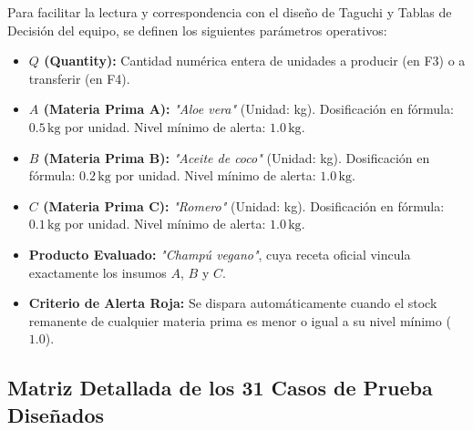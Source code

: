 \documentclass[11pt,a4paper]{article}
\begin{document}
\begin{tcolorbox}[colback=primary!5,colframe=primary,title=\textbf{Nomenclatura y Variables de Prueba Utilizadas en la Matriz}]
Para facilitar la lectura y correspondencia con el diseño de Taguchi y Tablas de Decisión del equipo, se definen los siguientes parámetros operativos:
\begin{itemize}[noitemsep]
    \item \textbf{$Q$ (Quantity):} Cantidad numérica entera de unidades a producir (en F3) o a transferir (en F4).
    \item \textbf{$A$ (Materia Prima A):} \textit{"Aloe vera"} (Unidad: kg). Dosificación en fórmula: $0.5\,\text{kg}$ por unidad. Nivel mínimo de alerta: $1.0\,\text{kg}$.
    \item \textbf{$B$ (Materia Prima B):} \textit{"Aceite de coco"} (Unidad: kg). Dosificación en fórmula: $0.2\,\text{kg}$ por unidad. Nivel mínimo de alerta: $1.0\,\text{kg}$.
    \item \textbf{$C$ (Materia Prima C):} \textit{"Romero"} (Unidad: kg). Dosificación en fórmula: $0.1\,\text{kg}$ por unidad. Nivel mínimo de alerta: $1.0\,\text{kg}$.
    \item \textbf{Producto Evaluado:} \textit{"Champú vegano"}, cuya receta oficial vincula exactamente los insumos $A$, $B$ y $C$.
    \item \textbf{Criterio de Alerta Roja:} Se dispara automáticamente cuando el stock remanente de cualquier materia prima es menor o igual a su nivel mínimo ($1.0$).
\end{itemize}
\end{tcolorbox}

\subsection{Matriz Detallada de los 31 Casos de Prueba Diseñados}
\end{document}
